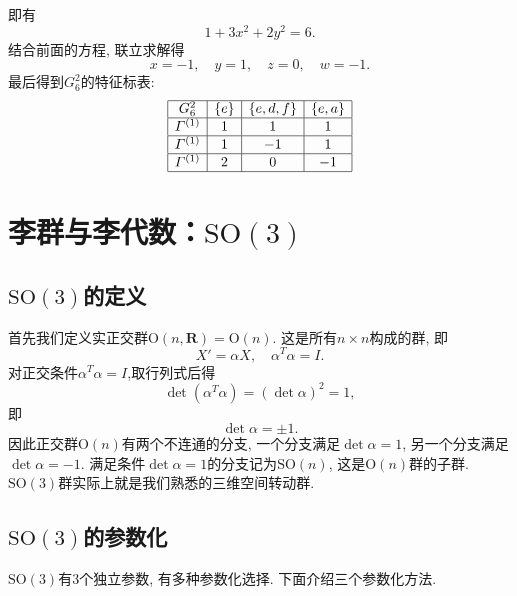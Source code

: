 \documentclass[UTF8]{ctexart}
\begin{document}
即有
\begin{equation}
  1 + 3x^2 + 2y^2 = 6.
\end{equation}
结合前面的方程, 联立求解得
\begin{equation}
  x = -1, \quad y = 1, \quad z = 0, \quad w = -1.
\end{equation}
最后得到$G_6^2$的特征标表:
\begin{equation}
  \begin{array}{|c|c|c|c|}
    \hline
    G_6^2 & \{e\} & \{e, d, f\} & \{e, a\} \\
    \hline
    \varGamma^{(1)} & 1 & 1 & 1 \\
    \hline
    \varGamma^{(1)} & 1 & -1 & 1 \\
    \hline
    \varGamma^{(1)} & 2 & 0 & -1 \\
    \hline
  \end{array}
\end{equation}
\section{李群与李代数：$\mathrm{SO}(3)$}
\subsection{$\mathrm{SO}(3)$的定义}
首先我们定义实正交群$\mathrm{O}(n,\mathbf{R}) = \mathrm{O}(n)$. 这是所有$n \times n$构成的群, 即
\begin{equation}
  X' = \alpha X, \quad \alpha^{T} \alpha = I.
\end{equation}
对正交条件$\alpha^{T} \alpha = I$,取行列式后得
\begin{equation}
  \det (\alpha^T \alpha) = (\det \alpha)^2 = 1,
\end{equation}
即
\begin{equation}
  \det \alpha = \pm 1.
\end{equation}
因此正交群$\mathrm{O}(n)$有两个不连通的分支, 一个分支满足$\det \alpha = 1$, 另一个分支满足$\det \alpha = -1$. 满足条件$\det \alpha = 1$的分支记为$\mathrm{SO}(n)$, 这是$\mathrm{O}(n)$群的子群. $\mathrm{SO}(3)$群实际上就是我们熟悉的三维空间转动群.
\subsection{$\mathrm{SO}(3)$的参数化}
$\mathrm{SO}(3)$有3个独立参数, 有多种参数化选择. 下面介绍三个参数化方法.
\end{document}
